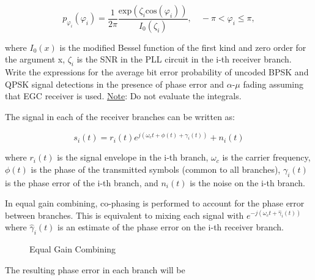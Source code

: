 \documentclass[fleqn]{article}
\makeatletter
\newenvironment{equationCenter}{\@fleqnfalse\begin{equation*}}{\end{equation*}}
\makeatother
\begin{document}
\begin{enumerate}
		\begin{equationCenter}
			p_{\varphi_i}(\varphi_i) = \frac{1}{2\pi}\frac{\text{exp}(\zeta_i\text{cos}(\varphi_i))}{I_0(\zeta_i)}, \quad -\pi < \varphi_i \leq \pi,
		\end{equationCenter}
		
		where $I_0(x)$ is the modified Bessel function of the first kind and zero order for the argument x, $\zeta_i$ is the SNR in the PLL circuit in the i-th receiver branch. Write the expressions for the average bit error probability of uncoded BPSK and QPSK signal detections in the presence of phase error and $\alpha$-$\mu$ fading assuming that EGC receiver is used. \underline{Note}: Do not evaluate the integrals.
		
		The signal in each of the receiver branches can be written as:
		
		\begin{equation*}
			s_i(t) = r_i(t)e^{j(\omega_ct + \phi(t) + \gamma_i(t))} + n_i(t)
		\end{equation*}
		
		where $r_i(t)$ is the signal envelope in the i-th branch, $\omega_c$ is the carrier frequency, $\phi(t)$ is the phase of the transmitted symbols (common to all branches), $\gamma_i(t)$ is the phase error of the i-th branch, and $n_i(t)$ is the noise on the i-th branch.
		
		In equal gain combining, co-phasing is performed to account for the phase error between branches. This is equivalent to mixing each signal with $e^{-j(\omega_ct + \hat{\gamma}_i(t))}$ where $\hat{\gamma}_i(t)$ is an estimate of the phase error on the i-th receiver branch.
		
		\begin{figure}[H]
			\centerline{}
			\caption{Equal Gain Combining}
			\label{fig::equal_gain_combining}
		\end{figure}
		
		The resulting phase error in each branch will be
		

\end{enumerate}
\end{document}
